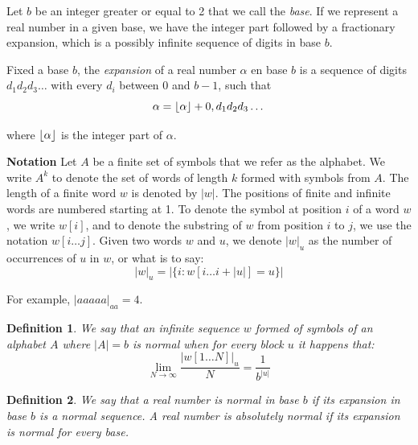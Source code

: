 \documentclass[11pt,a4paper]{tesis}
\newtheorem{theorem}{Theorem}[]
\newtheorem{definition}{Definition}[]
\DeclarePairedDelimiter{\floor}{\lfloor}{\rfloor}
\newcommand{\note}[1]{\textbf{\color{red}{#1}}}
\begin{document}
Let $b$ be an integer greater or equal to 2 that we call the \textit{base}. If we represent a real number in a given base, we have the integer part followed by a fractionary expansion, which is a possibly infinite sequence of digits in base $b$.

Fixed a base $b$, the \textit{expansion} of a real number $\alpha$ en base $b$ is a sequence of digits $d_1d_2d_3\dots$ with every $d_i$ between 0 and $b-1$, such that
$$\alpha = \floor{\alpha} + 0,d_1d_2d_3\dots$$

where $\floor{\alpha}$ is the integer part of $\alpha$.

\textbf{Notation}
Let $A$ be a finite set of symbols that we refer as the alphabet. We write $A^k$ to denote the set of words of length $k$ formed with symbols from $A$. The length of a finite word $w$ is denoted by $|w|$.
The positions of finite and infinite words are numbered starting at 1. To denote the symbol at position $i$ of a word $w$, we write $w[i]$, and to denote the substring of $w$ from position $i$ to $j$, we use the notation $w[i \dots j]$.  
Given two words $w$ and $u$, we denote $|w|_u$ as the number of occurrences of $u$ in $w$, or what is to say:
    $$|w|_u = |\{i: w[i \dots i + |u|] = u\}|$$

For example, $|aaaaa|_{aa} = 4$.
\\

\begin{definition}
    We say that an infinite sequence $w$ formed of symbols of an alphabet $A$ where $|A| = b$ is \textit{normal} when for every block $u$ it happens that:
    $$\lim_{N\to\infty} \frac{|w[1 \dots N]|_u}{N} = \frac{1}{b^{|u|}}$$
\end{definition}

\begin{definition}
    We say that a real number is {\em normal} in base $b$ if its expansion in base $b$ is a normal sequence. 
    A real number is \textit{absolutely normal} if its expansion is normal for every base.
\end{definition}


\end{document}
